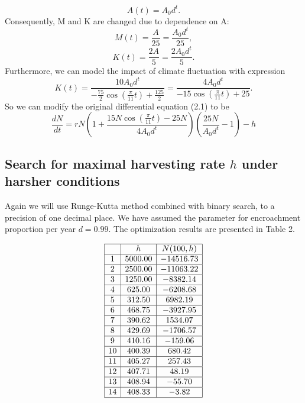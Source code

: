 \documentclass{amsart}
\theoremstyle{definition}
\theoremstyle{remark}
\numberwithin{equation}{section}
\begin{document}
\begin{equation}
    A(t)=A_0d^t.
\end{equation}
Consequently, M and K are changed due to dependence on A:
\begin{equation}
    M(t)=\frac{A}{25}=\frac{A_0d^t}{25},
\end{equation}
\begin{equation}
    K(t)=\frac{2A}{5}=\frac{2A_0d^t}{5}.
\end{equation}
Furthermore, we can model the impact of climate fluctuation with expression
\begin{equation}
    K(t)=\frac{10A_0d^t}{-\frac{75}{2}\cos(\frac{\pi}{11}t)+\frac{125}{2}}=\frac{4A_0d^t}{-15\cos(\frac{\pi}{11}t)+25}.
\end{equation}
So we can modify the original differential equation (2.1) to be
\begin{equation}
    \frac{dN}{dt}=rN(1+\frac{15N\cos(\frac{\pi}{11}t)-25N}{4A_0d^t})(\frac{25N}{A_0d^t}-1)-h
\end{equation}
\subsection{Search for maximal harvesting rate $h$ under harsher conditions} Again we will use Runge-Kutta method combined with binary search, to a precision of one decimal place. We have assumed the parameter for encroachment proportion per year $d=0.99$. The optimization results are presented in Table 2.

% 
\begin{table}[ht]
\caption{}\label{eqtable}
\renewcommand\arraystretch{1.5}
\noindent\[
\begin{array}{|c|c|c|}
    \hline
  & h & N(100,h) \\ \hline
 1 & 5000.00 & -14516.73 \\ 
   \hline
2 & 2500.00 & -11063.22 \\ 
   \hline
3 & 1250.00 & -8382.14 \\ 
   \hline
4 & 625.00 & -6208.68 \\ 
   \hline
5 & 312.50 & 6982.19 \\ 
   \hline
6 & 468.75 & -3927.95 \\ 
   \hline
7 & 390.62 & 1534.07 \\ 
   \hline
8 & 429.69 & -1706.57 \\ 
   \hline
9 & 410.16 & -159.06 \\ 
   \hline
10 & 400.39 & 680.42 \\ 
   \hline
11 & 405.27 & 257.43 \\ 
   \hline
12 & 407.71 & 48.19 \\ 
   \hline
13 & 408.94 & -55.70 \\ 
   \hline
14 & 408.33 & -3.82 \\ 
   \hline
\end{array}
\]
\end{table}
\end{document}
